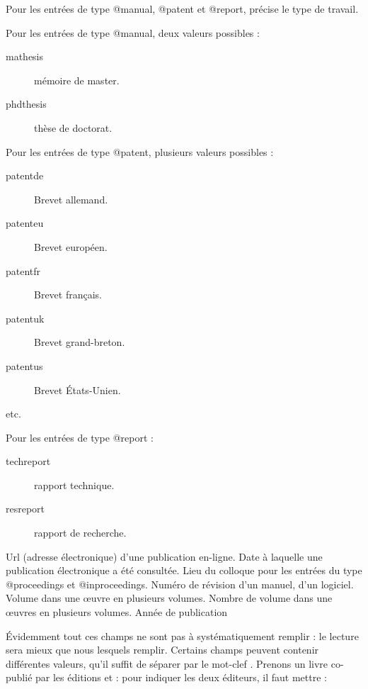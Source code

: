\begin{fieldlist}
					
   	 Pour les entrées de type  @manual, @patent et @report, précise le type de travail.
	
	 Pour les entrées de type @manual, deux valeurs possibles :
					\begin{description}
						\item[mathesis]mémoire de master.
						\item[phdthesis]thèse de doctorat.
					\end{description}
					
					 Pour les entrées de type @patent, plusieurs  valeurs possibles : 
					 
					 
					 \begin{description}
						\item[patentde] Brevet allemand.
						\item[patenteu] Brevet européen.
						\item[patentfr] Brevet français.
						\item[patentuk] Brevet grand-breton.
						\item[patentus] Brevet États-Unien.
						\item[etc.]
					 \end{description}
					
					Pour les entrées de type @report : 
					\begin{description}
						\item[techreport]rapport technique.
						\item[resreport]rapport de recherche.
					\end{description}
					
	 Url (adresse électronique) d'une publication en-ligne. 
   	 Date à laquelle une publication électronique a été consultée. 
   	 Lieu du colloque pour les entrées du type @proceedings et @inproceedings. 
   	 Numéro de révision d'un manuel, d'un logiciel. 
   	 Volume dans une œuvre en plusieurs volumes. 
   	 Nombre de volume dans une œuvres en plusieurs volumes. 
   	 Année de publication 				
\end{fieldlist}


Évidemment tout ces champs ne sont pas à systématiquement remplir : le lecture sera mieux que nous lesquels remplir. Certains champs peuvent contenir différentes valeurs, qu'il suffit de séparer par le mot-clef . Prenons un livre co-publié par les éditions  et  : pour indiquer les deux éditeurs, il faut mettre :

